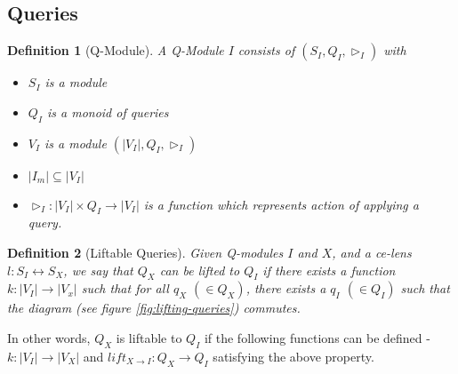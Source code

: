 \documentclass[a4paper,10pt]{article}
\newtheorem{definition}{Definition}
\begin{document}
\subsection{Queries}
\begin{definition}[Q-Module] A Q-Module $I$ consists of $(S_I,Q_I,\rhd_I)$ with
\begin{itemize}
\item $S_I$ is a module
\item $Q_I$ is a monoid of queries
\item $V_I$ is a module $(|V_I|,Q_I,\rhd_I)$
\item $|I_m| \subseteq |V_I|$
\item $\rhd_{I} : |V_I| \times Q_I \to |V_I|$ is a function which
  represents action of applying a query.


\end{itemize}
\end{definition} 

\begin{definition}[Liftable Queries]
Given Q-modules $I$ and $X$, and a ce-lens $l : S_I \leftrightarrow S_X$, we say that $Q_X$ can be lifted to $Q_I$ if there exists a function $k : |V_I| \to |V_x|$ such that for all $q_X$ $(\in Q_X)$, there exists a $q_I$ $(\in Q_I)$ such that the diagram (see figure \ref{fig:lifting-queries}) commutes.
\end{definition}

In other words, $Q_X$ is liftable to $Q_I$ if the following functions can be defined - $k: |V_I|  \to|V_X|$ and $lift_{X \to I}: Q_X \to Q_I$ satisfying the above property. 
\end{document}
